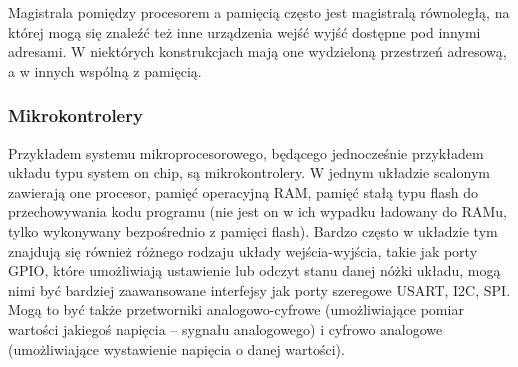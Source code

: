 Magistrala pomiędzy procesorem a pamięcią często jest magistralą równoległą, na której mogą się znaleźć też inne urządzenia wejść wyjść dostępne pod innymi adresami. W niektórych konstrukcjach mają one wydzieloną przestrzeń adresową, a w innych wspólną z pamięcią.

\subsubsection{Mikrokontrolery}

Przykładem systemu mikroprocesorowego, będącego jednocześnie przykładem układu typu system on chip, są mikrokontrolery. W jednym układzie scalonym zawierają one procesor, pamięć operacyjną RAM, pamięć stałą typu flash do przechowywania kodu programu (nie jest on w ich wypadku ładowany do RAMu, tylko wykonywany bezpośrednio z pamięci flash). Bardzo często w układzie tym znajdują się również różnego rodzaju układy wejścia-wyjścia, takie jak porty GPIO, które umożliwiają ustawienie lub odczyt stanu danej nóżki układu, mogą nimi być bardziej zaawansowane interfejsy jak porty szeregowe USART, I2C, SPI. Mogą to być także przetworniki analogowo-cyfrowe (umożliwiające pomiar wartości jakiegoś napięcia – sygnału analogowego) i cyfrowo analogowe (umożliwiające wystawienie napięcia o danej wartości).

